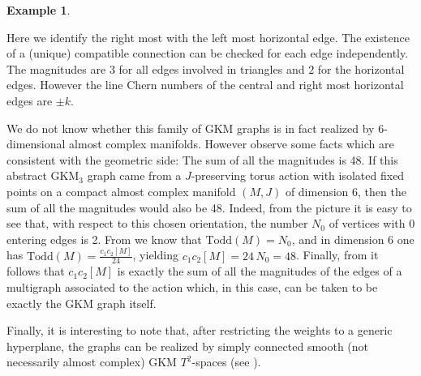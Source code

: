 \documentclass[12pt,a4paper]{amsart}
\theoremstyle{plain}
\theoremstyle{definition}
\newtheorem{ex}[thm]{Example}
\begin{document}
\begin{ex}
\begin{center}
		
	\end{center}
	

Here we identify the right most with the left most horizontal edge.
The existence of a (unique) compatible connection can be checked for each edge independently. The magnitudes are $3$ for all edges involved in triangles and $2$ for the horizontal edges. However the line Chern numbers of the central and right most horizontal edges are $\pm k$.

We do not know whether this family of GKM graphs is in fact realized
by 6-dimensional almost complex manifolds. However observe some facts which are consistent
with the geometric side: The sum of all the magnitudes is 48. If this abstract
GKM$_3$ graph came from a $J$-preserving torus action with isolated fixed points
on a compact almost complex manifold $(M,J)$ of dimension 6, then the sum of all the
magnitudes would also be 48. Indeed, from the picture it is easy to see that, with respect
to this chosen orientation, the number $N_0$ of vertices with 0 entering edges is 2. From
\cite[Remark 2.10]{MR776689} we know that $\mathrm{Todd}(M)=N_0$, and in dimension 6 one has
$\mathrm{Todd}(M)=\frac{c_1c_2[M]}{24}$, yielding $c_1c_2[M]=24\,N_0=48$. Finally, from
\cite[Prop. 4.6]{MR3230015} it follows that $c_1c_2[M]$ is exactly the sum of all the magnitudes
of the edges of a multigraph associated to the action which, in this case, can be taken to
be exactly the GKM graph itself.

Finally, it is interesting to note that, after restricting the weights to a generic
hyperplane, the graphs can be realized by simply connected smooth (not necessarily almost
complex) GKM $T^2$-spaces (see \cite{2210.01856v1}). 
\end{ex}
\end{document}
